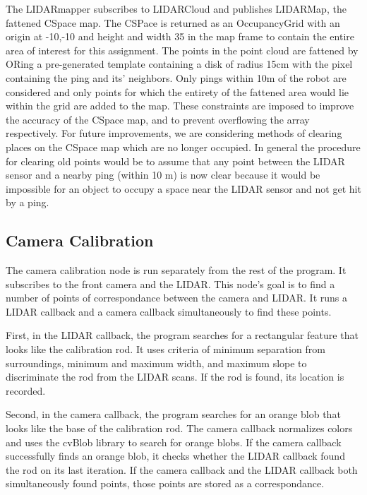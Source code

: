 \documentclass{article}
\begin{document}
The LIDARmapper subscribes to LIDARCloud and publishes LIDARMap, the fattened CSpace map.
The CSPace is returned as an OccupancyGrid with an origin at -10,-10 and height and width 35 in the map frame to contain the entire area of interest for this assignment.
The points in the point cloud are fattened by ORing a pre-generated template containing a disk of radius 15cm with the pixel containing the ping and its' neighbors.
Only pings within 10m of the robot are considered and only points for which the entirety of the fattened area would lie within the grid are added to the map.
These constraints are imposed to improve the accuracy of the CSpace map, and to prevent overflowing the array respectively.
For future improvements, we are considering methods of clearing places on the CSpace map which are no longer occupied.
In general the procedure for clearing old points would be to assume that any point between the LIDAR sensor and a nearby ping (within 10 m) is now clear because it would be impossible for an object to occupy a space near the LIDAR sensor and not get hit by a ping.



\subsection{Camera Calibration}

The camera calibration node is run separately from the rest of the program.  It subscribes to the front camera and the LIDAR.  This node's goal is to find a number of points of correspondance between the camera and LIDAR.  It runs a LIDAR callback and a camera callback simultaneously to find these points.

First, in the LIDAR callback, the program searches for a rectangular feature that looks like the calibration rod.  It uses criteria of minimum separation from surroundings, minimum and maximum width, and maximum slope to discriminate the rod from the LIDAR scans.  If the rod is found, its location is recorded.

Second, in the camera callback, the program searches for an orange blob that looks like the base of the calibration rod.  The camera callback normalizes colors and uses the cvBlob library to search for orange blobs.  If the camera callback successfully finds an orange blob, it checks whether the LIDAR callback found the rod on its last iteration.  If the camera callback and the LIDAR callback both simultaneously found points, those points are stored as a correspondance.
\end{document}
